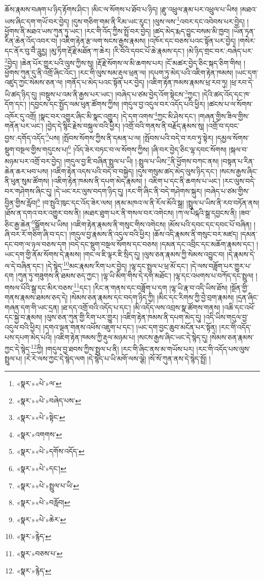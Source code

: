 ཆོས་རྣམས་བཞག་པ་ཉིད་རྟོགས་ཤིང་། །མིང་ལ་སོགས་པ་ཐོབ་པ་ཉིད། །རྫུ་འཕྲུལ་རྣམ་པར་འཕྲུལ་པ་ཡིས། །མཐའ་ཡས་ཞིང་དག་གཡོ་བར་བྱེད། །དུས་གཅིག་གམ་ནི་རིམ་ཡང་རུང་། །ལུས་ལས་\footnote{«སྣར་»«པེ་»ལ་}འབར་དང་འབེབས་པར་བྱེད། །ཕྱོགས་ནི་མཐའ་ཡས་ཀུན་ཏུ་ཡང་། །རང་གི་འོད་ཀྱིས་སྤྲོ་བར་བྱེད། །ཚད་མེད་རྨད་བྱུང་བསམ་མི་ཁྱབ། །ཡོན་ཏན་རིན་ཆེན་འོད་འབར་བ། །འཇིག་རྟེན་རྩ་ལག་སངས་རྒྱས་རྣམས། །འཁོར་དང་བཅས་པའང་སྟོན་པར་བྱེད། །གསེར་དང་ནོར་བུ་བཻ་ཌཱུརྱ། །མུ་ཏིག་རྡོ་རྗེ་མཐོན་ཀ་ཆེར། །རི་བོའི་དབང་པོ་ཆེ་རྣམས་དང་། །མེ་ཉིད་གྲང་བར་:བཞེད་པར་\footnote{«སྣར་»«པེ་»བཞེད་པས་}བྱེད། །ཆེན་པོར་གྱུར་པའི་ལུས་ཀྱིས་སུ། །རྡོ་རྗེ་སོགས་ལ་མི་ཆགས་པར། །ངོ་མཚར་བྱེད་ཅིང་སྐད་ཅིག་གིས། །ཕྱོགས་ཀུན་དུ་ནི་འགྲོ་ཞིང་འོང་། །རང་གི་ལུས་སམ་རྡུལ་ཕྲན་ལ། །དཔག་ཏུ་མེད་པའི་འཇིག་རྟེན་ཁམས། །ཡང་དག་འཛུད་ཀྱང་སེམས་ཅན་ལ། །གནོད་པ་མེད་པའང་སྟོན་པར་བྱེད། །འཇིག་རྟེན་ཁམས་རྣམས་ཕྲ་རབ་ཏུ། །ཕྲ་རབ་དེ་ཡི་ཚད་ཉིད་དུ། །བསྡུས་པ་འམ་ནི་རྒྱས་པར་ཡང་། །བཞེད་པ་ཙམ་བྱེད་འོག་སྟེངས་\footnote{«སྣར་»«པེ་»སྟེང་}ཀྱང་། །དེའི་ཚད་འོད་དང་ཁ་དོག་དང་། །དབྱངས་དང་སྤྱོད་ལམ་ཕུན་ཚོགས་ཀྱིས། །གདུལ་བྱ་འདུལ་བར་འདོད་པའི་ཕྱིར། །ཚངས་པ་ལ་སོགས་འཁོར་དུ་འགྲོ། །སྣང་བར་འགྱུར་ཞིང་མི་སྣང་འགྱུར། །དེ་དག་འགས་\footnote{«སྣར་»འགགས་}ཀྱང་མི་ཤེས་དང་། །གཞན་གྱིས་ཟིལ་གྱིས་གནོན་པར་ཡང་། །བྱེད་དེ་སྙིང་རྗེས་བསྐུལ་བའི་ཕྱིར། །འགྲོ་བའི་གནས་ནི་བརྗོད་རྣམས་སུ། །འགྲོ་བ་དབང་བྱས་:དགོད་འདོད་\footnote{«སྣར་»«པེ་»དགོས་འདོད་}པས། །སྤོབས་སོགས་ཀྱིས་ནི་དམན་པ་ལ། །སྤོབས་པའི་བདེ་བ་རབ་ཏུ་སྟེར། །དམྱལ་སོགས་སྡུག་བསྔལ་གྱིས་གདུངས་པ།\footnote{«སྣར་»«པེ་»དང་།} །འོད་ཟེར་བཏང་བ་ལ་སོགས་ཀྱིས། །ཞི་བར་བྱེད་ཅིང་ལྷ་དབང་སོགས། །སྐལ་བ་མཉམ་པར་འགྲོ་བར་བྱེད། །གདུལ་བྱ་ཇི་བཞིན་སྤྲུལ་པ་ཡི། །:སྤྲུལ་པ་ཡིས་\footnote{«སྣར་»«པེ་»སྤྲུལ་པ་ཡི་}ནི་ཕྱོགས་བཀང་ནས། །བསྟན་པ་རིན་ཆེན་ཆར་ཕབ་པས། །འཇིག་རྟེན་འདས་པའི་བདེ་བ་བསྐྱེད། །དུས་གསུམ་ཚད་མེད་ལུས་ཉིད་དང་། །སངས་རྒྱས་ཞིང་ནི་ཕུན་སུམ་ཚོགས། །འཇིག་རྟེན་ཁམས་ནི་དཔག་མེད་རྣམས། །
འཇིག་པ་དང་ནི་ཆགས་པ་ཡང་། །རང་ལུས་བདེ་བར་གཤེགས་ཞིང་དུ། །དེ་ཡང་རང་ལུས་བདག་ཉིད་དུ། །རང་གི་ཞིང་ནི་བདེ་གཤེགས་སྐུར། །བཞེད་པ་ཙམ་གྱིས་བྱིན་གྱིས་རློབ།\footnote{«སྣར་»«པེ་»བརློབ།} །བ་སྤུའི་ཁུང་དང་འོད་ཟེར་ལས། །ནམ་མཁའ་ལ་ནི་རོལ་མོའི་སྒྲ། །སྤྲུལ་པ་ཡིས་ནི་རབ་བཏོན་ནས། །ཐོས་ན་དགའ་བར་འགྱུར་བས་ནི། །མཐར་ཐུག་པར་ནི་གསལ་བར་འགེངས། །ཀ་ལ་པིངྐའི་སྒྲ་དབྱངས་ནི། །ཟབ་ཅིང་རྒྱ་ཆེན་\footnote{«སྣར་»«པེ་»ཆེར་}སྒྲོགས་པ་ཡིས། །འཇིག་རྟེན་རྣམས་ནི་གསུང་གིས་འགེངས། །མོས་པའི་དབང་དང་དབང་པོ་བཞིན། །ཞི་བར་རོ་གཅིག་ཞི་བ་དང་། །གདུལ་བྱ་རྣམས་ནི་འདུལ་བའི་ཕྱིར། །ཆོས་འདི་རྣམས་ནི་གསུང་བར་མཛད། །དམན་དང་བག་ལ་ཉལ་བཅས་དག །བདེ་དང་སྡུག་བསྔལ་སོགས་དང་བཅས། །དམན་དང་འབྲིང་དང་མཆོག་རྣམས་དང་། །ཡང་དག་གྱི་ནོམ་སོགས་དེ་རྣམས། །གང་ལ་ཇི་ལྟར་ཇི་སྲིད་དུ། །ལུས་ཅན་རྣམས་ཀྱི་སེམས་འབྱུང་བ། །དེ་རྣམས་དེ་ལ་དེ་བཞིན་དང་། །དེ་སྙེད་\footnote{«སྣར་»རྙེད་}མང་རྣམས་རིག་པར་བྱེད། །ལྷ་དང་སྤྲུལ་པ་ཕྲ་མོ་དང་། །དེ་ལས་བཟློག་པར་གྱུར་པ་དག །ཀུན་ཏུ་གཟུགས་ནི་ཐམས་ཅད་ཀྱང་། །ལྷ་ཡི་མིག་གིས་དེ་དག་མཐོང་། །ལྷ་དང་འཕགས་པ་བཀོད་དང་སྤྲུལ། །གསལ་པོའི་སྒྲ་དང་མིར་བཅས་\footnote{«སྣར་»བཅས་པ་}དང་། །རིང་ན་གནས་དང་བཟློག་པ་དག །ལྷ་ཡི་རྣ་བ་འདི་ཡིས་ཐོས། །སྔོན་གྱི་གནས་རྣམས་ཐམས་ཅད་དེ། །སེམས་ཅན་རྣམས་དང་བདག་ཉིད་ཀྱི། །མིང་དང་རིགས་ཀྱི་བྱེ་བྲག་རྣམས། །དྲན་ཞིང་གཞན་དག་གི་ཡང་དྲན། །ཐ་དད་འགྲོ་བའི་འདོད་པ་དང་། །མི་འདོད་ལས་འབྲས་སྣ་ཚོགས་གནས། །འཆི་དང་འཕོ་དང་སྐྱེ་བ་རྣམས། །ལུས་ཅན་ཀུན་གྱི་རིག་པར་གྱུར། །འཇིག་རྟེན་ཁམས་ནི་དཔག་མེད་དུ། །འདི་ཡིས་གདུལ་བྱ་འདུལ་བའི་ཕྱིར། །དགའ་ལྡན་གནས་འཕོས་འཇུག་པ་དང་། །ཡང་དག་བྱང་ཆུབ་མངོན་པར་སྟོན། །རང་གི་འདོད་པས་དཔག་མེད་པའི། །འཇིག་རྟེན་ཁམས་ཀྱི་རྡུལ་མཉམ་པ། །སངས་རྒྱས་ཞིང་ཡང་དེ་སྙེད་དུ། །སེམས་ཅན་རྣམས་ཀྱང་དེ་སྙེད་\footnote{«སྣར་»རྙེད་}ཀྱི། །གདུལ་བྱ་ཐབས་ཀྱིས་སྤྲུལ་པ་ནི། །རང་གི་ཞིང་ནས་མ་གཡོས་པར། །རང་གི་འདོད་པས་ལུས་སྤྲུལ་པ། །རེ་རེ་ལས་ཀྱང་དེ་སྙེད་ལག །དེ་སྙེད་པ་ཡི་མགོ་ལས་ལྕེ། །སོ་སོ་ཀུན་ནས་དེ་སྙེད་སྤྲོ། །
